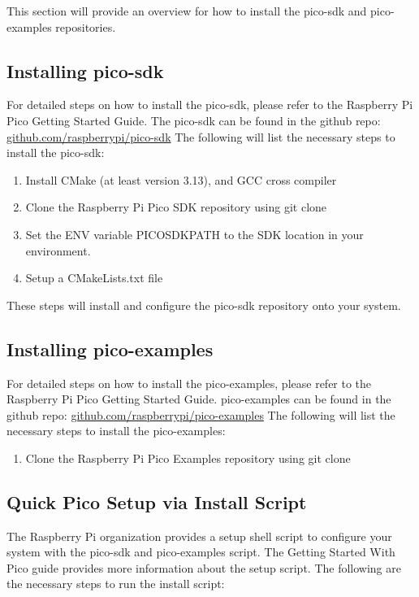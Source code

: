 {This section will provide an overview for how to install the pico-sdk and pico-examples repositories.

\subsection{Installing pico-sdk}
For detailed steps on how to install the pico-sdk, please refer to the \cite{ref__RP_Getting_Started} Raspberry Pi Pico Getting Started Guide. 
The pico-sdk can be found in the github repo: \url{github.com/raspberrypi/pico-sdk}
The following will list the necessary steps to install the pico-sdk:

\begin{enumerate}
    \item Install CMake (at least version 3.13), and GCC cross compiler
    \item Clone the Raspberry Pi Pico SDK repository using git clone
    \item Set the ENV variable PICO\textunderscore SDK\textunderscore PATH to the SDK location in your environment.
    \item Setup a CMakeLists.txt file
\end{enumerate}

These steps will install and configure the pico-sdk repository onto your system.

\subsection{Installing pico-examples}
For detailed steps on how to install the pico-examples, please refer to the \cite{ref__RP_Getting_Started} Raspberry Pi Pico Getting Started Guide. 
pico-examples can be found in the github repo: \url{github.com/raspberrypi/pico-examples}
The following will list the necessary steps to install the pico-examples:

\begin{enumerate}
    \item Clone the Raspberry Pi Pico Examples repository using git clone
\end{enumerate}

\subsection{Quick Pico Setup via Install Script}
The Raspberry Pi organization provides a setup shell script to configure your system with the pico-sdk and pico-examples script. 
The Getting Started With Pico \cite{ref__RP_Getting_Started} guide provides more information about the setup script.
The following are the necessary steps to run the install script:

}
